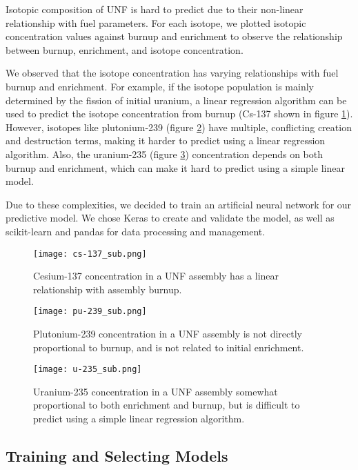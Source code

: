 Isotopic composition of \gls{UNF} is hard to predict due to their
non-linear relationship with fuel parameters. For each
isotope, we plotted isotopic concentration values against
burnup and enrichment to observe the relationship between
burnup, enrichment, and isotope concentration.

We observed that the isotope concentration has varying
relationships with fuel burnup and enrichment.
For example, if the isotope population is mainly determined by
the fission of initial uranium, a linear regression algorithm
can be used to predict the isotope concentration from burnup
(Cs-137 shown in figure \ref{fig:cs_137}).
However, isotopes like plutonium-239 (figure \ref{fig:pu_239}) have multiple, conflicting creation
and destruction terms, making it harder to predict using a
linear regression algorithm. Also, the uranium-235 (figure \ref{fig:u_235}) concentration
depends on both burnup and enrichment, which can make it
hard to predict using a simple linear model.

Due to these complexities, we decided to train an artificial
neural network for our predictive model. We chose
Keras to create and validate the model, as well as scikit-learn
and pandas for data processing and management.

\begin{figure}
    \centering
    \texttt{[image: cs-137\_sub.png]}
    \caption{Cesium-137 concentration in a \gls{UNF} assembly
             has a linear relationship with assembly burnup.}
    \label{fig:cs_137}
\end{figure}

\begin{figure}
    \centering
    \texttt{[image: pu-239\_sub.png]}
    \caption{Plutonium-239 concentration in a \gls{UNF} assembly
             is not directly proportional to burnup, and is
             not related to initial enrichment.}
    \label{fig:pu_239}
\end{figure}


\begin{figure}
    \centering
    \texttt{[image: u-235\_sub.png]}
    \caption{Uranium-235 concentration in a \gls{UNF} assembly
             somewhat proportional to both enrichment and
             burnup, but is difficult to predict using
             a simple linear regression algorithm.}
    \label{fig:u_235}
\end{figure}


\subsection{Training and Selecting Models}

